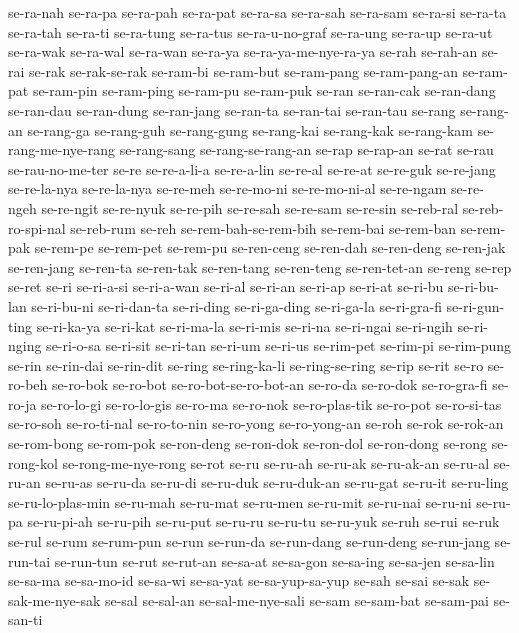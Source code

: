 {se-ra-nah se-ra-pa se-ra-pah se-ra-pat se-ra-sa se-ra-sah se-ra-sam
se-ra-si se-ra-ta se-ra-tah se-ra-ti se-ra-tung se-ra-tus se-ra-u-no-graf
se-ra-ung se-ra-up se-ra-ut se-ra-wak se-ra-wal se-ra-wan se-ra-ya
se-ra-ya-me-nye-ra-ya se-rah se-rah-an se-rai se-rak se-rak-se-rak
se-ram-bi se-ram-but se-ram-pang se-ram-pang-an se-ram-pat se-ram-pin
se-ram-ping se-ram-pu se-ram-puk se-ran se-ran-cak se-ran-dang se-ran-dau
se-ran-dung se-ran-jang se-ran-ta se-ran-tai se-ran-tau se-rang se-rang-an
se-rang-ga se-rang-guh se-rang-gung se-rang-kai se-rang-kak se-rang-kam
se-rang-me-nye-rang se-rang-sang se-rang-se-rang-an se-rap se-rap-an
se-rat se-rau se-rau-no-me-ter se-re se-re-a-li-a se-re-a-lin se-re-al
se-re-at se-re-guk se-re-jang se-re-la-nya se-re-la-nya se-re-meh
se-re-mo-ni se-re-mo-ni-al se-re-ngam se-re-ngeh se-re-ngit se-re-nyuk
se-re-pih se-re-sah se-re-sam se-re-sin se-reb-ral se-reb-ro-spi-nal
se-reb-rum se-reh se-rem-bah-se-rem-bih se-rem-bai se-rem-ban se-rem-pak
se-rem-pe se-rem-pet se-rem-pu se-ren-ceng se-ren-dah se-ren-deng
se-ren-jak se-ren-jang se-ren-ta se-ren-tak se-ren-tang se-ren-teng
se-ren-tet-an se-reng se-rep se-ret se-ri se-ri-a-si se-ri-a-wan se-ri-al
se-ri-an se-ri-ap se-ri-at se-ri-bu se-ri-bu-lan se-ri-bu-ni se-ri-dan-ta
se-ri-ding se-ri-ga-ding se-ri-ga-la se-ri-gra-fi se-ri-gun-ting
se-ri-ka-ya se-ri-kat se-ri-ma-la se-ri-mis se-ri-na se-ri-ngai se-ri-ngih
se-ri-nging se-ri-o-sa se-ri-sit se-ri-tan se-ri-um se-ri-us se-rim-pet
se-rim-pi se-rim-pung se-rin se-rin-dai se-rin-dit se-ring se-ring-ka-li
se-ring-se-ring se-rip se-rit se-ro se-ro-beh se-ro-bok se-ro-bot
se-ro-bot-se-ro-bot-an se-ro-da se-ro-dok se-ro-gra-fi se-ro-ja
se-ro-lo-gi se-ro-lo-gis se-ro-ma se-ro-nok se-ro-plas-tik se-ro-pot
se-ro-si-tas se-ro-soh se-ro-ti-nal se-ro-to-nin se-ro-yong se-ro-yong-an
se-roh se-rok se-rok-an se-rom-bong se-rom-pok se-ron-deng se-ron-dok
se-ron-dol se-ron-dong se-rong se-rong-kol se-rong-me-nye-rong se-rot
se-ru se-ru-ah se-ru-ak se-ru-ak-an se-ru-al se-ru-an se-ru-as se-ru-da
se-ru-di se-ru-duk se-ru-duk-an se-ru-gat se-ru-it se-ru-ling
se-ru-lo-plas-min se-ru-mah se-ru-mat se-ru-men se-ru-mit se-ru-nai
se-ru-ni se-ru-pa se-ru-pi-ah se-ru-pih se-ru-put se-ru-ru se-ru-tu
se-ru-yuk se-ruh se-rui se-ruk se-rul se-rum se-rum-pun se-run se-run-da
se-run-dang se-run-deng se-run-jang se-run-tai se-run-tun se-rut se-rut-an
se-sa-at se-sa-gon se-sa-ing se-sa-jen se-sa-lin se-sa-ma se-sa-mo-id
se-sa-wi se-sa-yat se-sa-yup-sa-yup se-sah se-sai se-sak se-sak-me-nye-sak
se-sal se-sal-an se-sal-me-nye-sali se-sam se-sam-bat se-sam-pai se-san-ti
}
